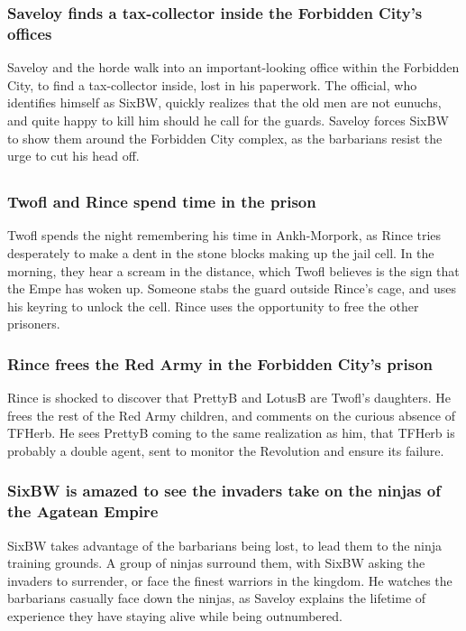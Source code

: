 \subsubsection{\Gls{Saveloy} finds a tax-collector inside the Forbidden City's offices}
\Gls{Saveloy} and the horde walk into an important-looking office within the Forbidden City, to find
a tax-collector inside, lost in his paperwork. The official, who identifies himself as \Gls{SixBW},
quickly realizes that the old men are not eunuchs, and quite happy to kill him should he call for
the guards. \Gls{Saveloy} forces \Gls{SixBW} to show them around the Forbidden City complex, as the
barbarians resist the urge to cut his head off.

\subsection{}
\subsubsection{\Gls{Twofl} and \Gls{Rince} spend time in the prison}
\Gls{Twofl} spends the night remembering his time in Ankh-Morpork, as \Gls{Rince} tries desperately
to make a dent in the stone blocks making up the jail cell. In the morning, they hear a scream in
the distance, which \Gls{Twofl} believes is the sign that the \Gls{Empe} has woken up. Someone stabs
the guard outside \Gls{Rince}'s cage, and uses his keyring to unlock the cell. \Gls{Rince} uses the
opportunity to free the other prisoners.

\subsubsection{\Gls{Rince} frees the Red Army in the Forbidden City's prison}
\Gls{Rince} is shocked to discover that \Gls{PrettyB} and \Gls{LotusB} are \Gls{Twofl}'s daughters.
He frees the rest of the Red Army children, and comments on the curious absence of \Gls{TFHerb}.
He sees \Gls{PrettyB} coming to the same realization as him, that \Gls{TFHerb} is probably a double
agent, sent to monitor the Revolution and ensure its failure.

\subsubsection{\Gls{SixBW} is amazed to see the invaders take on the ninjas of the Agatean Empire}
\Gls{SixBW} takes advantage of the barbarians being lost, to lead them to the ninja training
grounds. A group of ninjas surround them, with \Gls{SixBW} asking the invaders to surrender, or
face the finest warriors in the kingdom. He watches the barbarians casually face down the ninjas,
as \Gls{Saveloy} explains the lifetime of experience they have staying alive while being
outnumbered.


